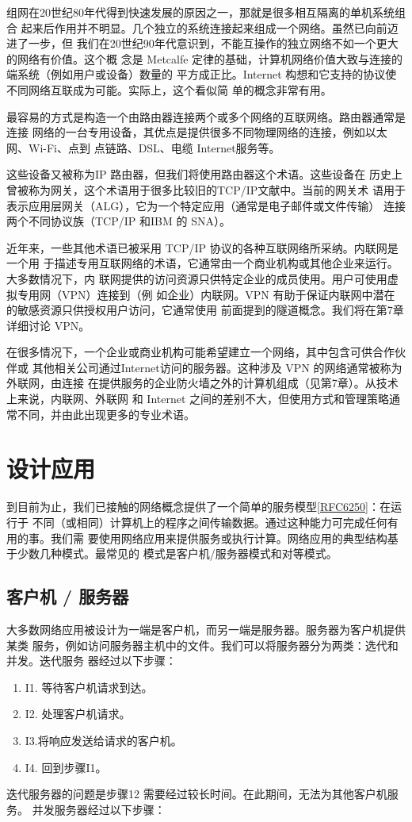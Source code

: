 组网在20世纪80年代得到快速发展的原因之一，那就是很多相互隔离的单机系统组合
起来后作用并不明显。几个独立的系统连接起来组成一个网络。虽然已向前迈进了一步，但
我们在20世纪90年代意识到，不能互操作的独立网络不如一个更大的网络有价值。这个概
念是 Metcalfe 定律的基础，计算机网络价值大致与连接的端系统（例如用户或设备）数量的
平方成正比。Internet 构想和它支持的协议使不同网络互联成为可能。实际上，这个看似简
单的概念非常有用。

最容易的方式是构造一个由路由器连接两个或多个网络的互联网络。路由器通常是连接
网络的一台专用设备，其优点是提供很多不同物理网络的连接，例如以太网、Wi-Fi、点到
点链路、DSL、电缆 Internet服务等。

\begin{tcolorbox}
    这些设备又被称为IP 路由器，但我们将使用路由器这个术语。这些设备在
    历史上曾被称为网关，这个术语用于很多比较旧的TCP/IP文献中。当前的网关术
    语用于表示应用层网关（ALG），它为一个特定应用（通常是电子邮件或文件传输）
    连接两个不同协议族（TCP/IP 和IBM 的 SNA）。
\end{tcolorbox}
近年来，一些其他术语已被采用 TCP/IP 协议的各种互联网络所采纳。内联网是一个用
于描述专用互联网络的术语，它通常由一个商业机构或其他企业来运行。大多数情况下，内
联网提供的访问资源只供特定企业的成员使用。用户可使用虚拟专用网（VPN）连接到（例
如企业）内联网。VPN 有助于保证内联网中潜在的敏感资源只供授权用户访问，它通常使用
前面提到的隧道概念。我们将在第7章详细讨论 VPN。

在很多情况下，一个企业或商业机构可能希望建立一个网络，其中包含可供合作伙伴或
其他相关公司通过Internet访问的服务器。这种涉及 VPN 的网络通常被称为外联网，由连接
在提供服务的企业防火墙之外的计算机组成（见第7章）。从技术上来说，内联网、外联网
和 Internet 之间的差别不大，但使用方式和管理策略通常不同，并由此出现更多的专业术语。

\section{设计应用}
到目前为止，我们已接触的网络概念提供了一个简单的服务模型\href{https://www.rfc-editor.org/rfc/rfc6250}{[RFC6250]}：在运行于
不同（或相同）计算机上的程序之间传输数据。通过这种能力可完成任何有用的事。我们需
要使用网络应用来提供服务或执行计算。网络应用的典型结构基于少数几种模式。最常见的
模式是客户机/服务器模式和对等模式。

\subsection{客户机 / 服务器}
大多数网络应用被设计为一端是客户机，而另一端是服务器。服务器为客户机提供某类
服务，例如访问服务器主机中的文件。我们可以将服务器分为两类：选代和并发。迭代服务
器经过以下步骤：
\begin{enumerate}
    \item I1. 等待客户机请求到达。
    \item I2. 处理客户机请求。
    \item I3.将响应发送给请求的客户机。
    \item I4. 回到步骤I1。
\end{enumerate}
迭代服务器的问题是步骤12 需要经过较长时间。在此期间，无法为其他客户机服务。
并发服务器经过以下步骤：

